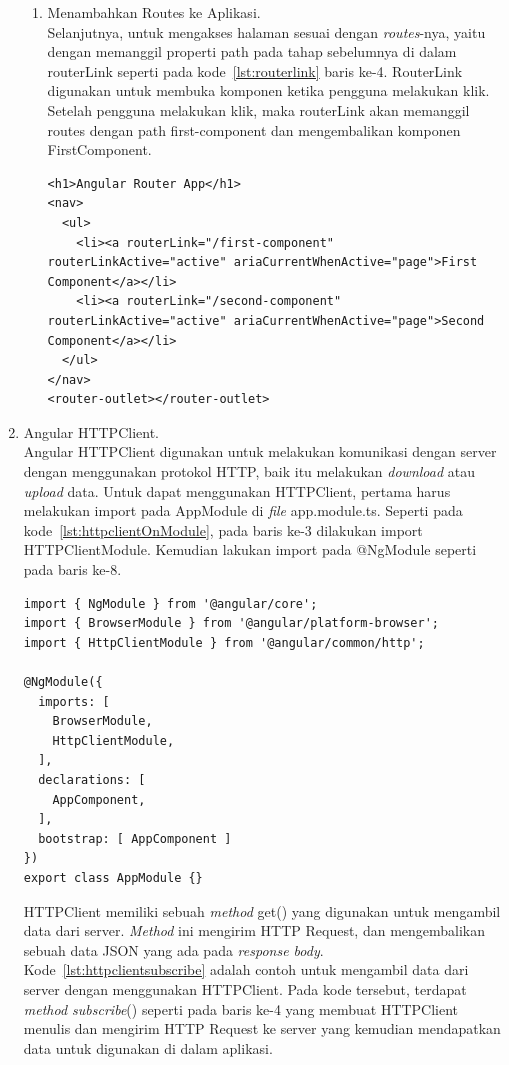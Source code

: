 \begin{enumerate}
\begin{enumerate}
	\item Menambahkan Routes ke Aplikasi. \\
	Selanjutnya, untuk mengakses halaman sesuai dengan \textit{routes}-nya, yaitu dengan memanggil properti path pada tahap sebelumnya di dalam routerLink seperti pada kode~\ref{lst:routerlink} baris ke-4. RouterLink digunakan untuk membuka komponen ketika pengguna melakukan klik. Setelah pengguna melakukan klik, maka routerLink akan memanggil routes dengan path first-component dan mengembalikan komponen FirstComponent.
	
\begin{lstlisting}[label={lst:routerlink}, caption={Contoh \textit{Routing} pada Angular}]
<h1>Angular Router App</h1>
<nav>
  <ul>
    <li><a routerLink="/first-component" routerLinkActive="active" ariaCurrentWhenActive="page">First Component</a></li>
    <li><a routerLink="/second-component" routerLinkActive="active" ariaCurrentWhenActive="page">Second Component</a></li>
  </ul>
</nav>
<router-outlet></router-outlet>
\end{lstlisting}

	\end{enumerate}	 
	
	\item Angular HTTPClient.  \\
	Angular HTTPClient digunakan untuk melakukan komunikasi dengan server dengan menggunakan protokol HTTP, baik itu melakukan \textit{download} atau \textit{upload} data. Untuk dapat menggunakan HTTPClient, pertama harus melakukan import pada AppModule di \textit{file} app.module.ts. Seperti pada kode~\ref{lst:httpclientOnModule}, pada baris ke-3 dilakukan import HTTPClientModule. Kemudian lakukan import pada @NgModule seperti pada baris ke-8.
	
\begin{lstlisting}[label={lst:httpclientOnModule}, caption={Contoh \textit{Routing} pada Angular}]
import { NgModule } from '@angular/core';
import { BrowserModule } from '@angular/platform-browser';
import { HttpClientModule } from '@angular/common/http';

@NgModule({
  imports: [
    BrowserModule,
    HttpClientModule,
  ],
  declarations: [
    AppComponent,
  ],
  bootstrap: [ AppComponent ]
})
export class AppModule {}
\end{lstlisting}

	HTTPClient memiliki sebuah \textit{method} get() yang digunakan untuk mengambil data dari server. \textit{Method} ini mengirim HTTP Request, dan mengembalikan sebuah data JSON yang ada pada \textit{response body}. Kode~\ref{lst:httpclientsubscribe} adalah contoh untuk mengambil data dari server dengan menggunakan HTTPClient. Pada kode tersebut, terdapat \textit{method subscribe}() seperti pada baris ke-4 yang membuat HTTPClient menulis dan mengirim HTTP Request ke server yang kemudian mendapatkan data untuk digunakan di dalam aplikasi.


\end{enumerate}
